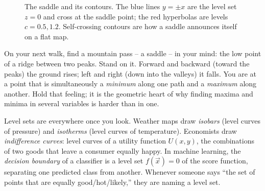 \begin{figure}[H]
\centering
{}
\hspace{0.2cm}
\caption{The saddle and its contours. The blue lines $y=\pm x$ are the level set $z=0$ and
cross at the saddle point; the red hyperbolas are levels $c=0.5,1.2$. Self-crossing contours
are how a saddle announces itself on a flat map.}
\label{ch32:fig-saddle}
\end{figure}

\begin{walkbox}
On your next walk, find a mountain pass -- a saddle -- in your mind: the low point of a ridge
between two peaks. Stand on it. Forward and backward (toward the peaks) the ground rises;
left and right (down into the valleys) it falls. You are at a point that is simultaneously a
\emph{minimum} along one path and a \emph{maximum} along another. Hold that feeling; it is the
geometric heart of why finding maxima and minima in several variables is harder than in one.
\end{walkbox}

\begin{applicationbox}
Level sets are everywhere once you look. Weather maps draw \emph{isobars} (level curves of
pressure) and \emph{isotherms} (level curves of temperature). Economists draw
\emph{indifference curves}: level curves of a utility function $U(x,y)$, the combinations of two
goods that leave a consumer equally happy. In machine learning, the \emph{decision boundary}
of a classifier is a level set $f(\vec x)=0$ of the score function, separating one predicted
class from another. Whenever someone says ``the set of points that are equally good/hot/likely,''
they are naming a level set.
\end{applicationbox}

